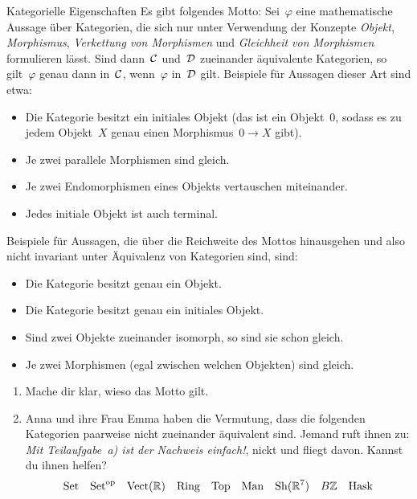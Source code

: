 \documentclass{uebblatt}
\begin{document}
\begin{aufgabe}{Kategorielle Eigenschaften}
Es gibt folgendes Motto: Sei~$\varphi$ eine mathematische Aussage über Kategorien, die
sich nur unter Verwendung der Konzepte \emph{Objekt}, \emph{Morphismus},
\emph{Verkettung von Morphismen} und \emph{Gleichheit von Morphismen}
formulieren lässt. Sind dann~$\mathcal{C}$ und~$\mathcal{D}$ zueinander äquivalente Kategorien,
so gilt~$\varphi$ genau dann in~$\mathcal{C}$, wenn~$\varphi$ in~$\mathcal{D}$ gilt.
Beispiele für Aussagen dieser Art sind etwa:
\begin{itemize}
\item Die Kategorie besitzt ein initiales Objekt (das ist ein Objekt~$0$,
sodass es zu jedem Objekt~$X$ genau einen Morphismus~$0 \to X$ gibt).
\item Je zwei parallele Morphismen sind gleich.
\item Je zwei Endomorphismen eines Objekts vertauschen miteinander.
\item Jedes initiale Objekt ist auch terminal.
\end{itemize}
Beispiele für Aussagen, die über die Reichweite des Mottos hinausgehen und also
nicht invariant unter Äquivalenz von Kategorien sind, sind:
\begin{itemize}
\item Die Kategorie besitzt genau ein Objekt.
\item Die Kategorie besitzt genau ein initiales Objekt.
\item Sind zwei Objekte zueinander isomorph, so sind sie schon gleich.
\item Je zwei Morphismen (egal zwischen welchen Objekten) sind gleich.
\end{itemize}

\begin{enumerate}
\item Mache dir klar, wieso das Motto gilt.
\item Anna und ihre Frau Emma haben die Vermutung, dass die folgenden
Kategorien paarweise nicht zueinander äquivalent sind. Jemand ruft ihnen zu:
\emph{Mit Teilaufgabe~a) ist der Nachweis einfach!}, nickt und fliegt davon. Kannst du ihnen
helfen?
\[ \mathrm{Set} \quad
  \mathrm{Set}^{\mathrm{op}} \quad
  \mathrm{Vect}(\mathbb{R}) \quad
  \mathrm{Ring} \quad
  \mathrm{Top} \quad
  \mathrm{Man} \quad
  \mathrm{Sh}(\mathbb{R}^7) \quad
  B\mathbb{Z} \quad
  \mathrm{Hask}
\]
\end{enumerate}
\end{aufgabe}
\newpage
\end{document}
